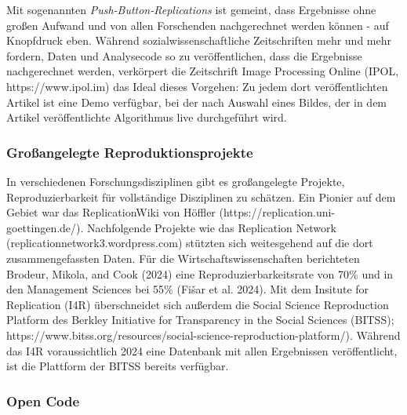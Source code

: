\documentclass[
  letterpaper,
  DIV=11,
  numbers=noendperiod]{scrreprt}
\begin{document}
\begin{tcolorbox}[enhanced jigsaw, left=2mm, colback=white, colframe=quarto-callout-note-color-frame, opacitybacktitle=0.6, opacityback=0, title=\textcolor{quarto-callout-note-color}{\faInfo}\hspace{0.5em}{Reproduktion auf Knopfdruck}, toptitle=1mm, coltitle=black, colbacktitle=quarto-callout-note-color!10!white, titlerule=0mm, bottomtitle=1mm, leftrule=.75mm, breakable, rightrule=.15mm, bottomrule=.15mm, toprule=.15mm, arc=.35mm]

Mit sogenannten \emph{Push-Button-Replications} ist gemeint, dass
Ergebnisse ohne großen Aufwand und von allen Forschenden nachgerechnet
werden können - auf Knopfdruck eben. Während sozialwissenschaftliche
Zeitschriften mehr und mehr fordern, Daten und Analysecode so zu
veröffentlichen, dass die Ergebnisse nachgerechnet werden, verkörpert
die Zeitschrift Image Processing Online (IPOL, https://www.ipol.im) das
Ideal dieses Vorgehen: Zu jedem dort veröffentlichten Artikel ist eine
Demo verfügbar, bei der nach Auswahl eines Bildes, der in dem Artikel
veröffentlichte Algorithmus live durchgeführt wird.

\end{tcolorbox}

\subsubsection{Großangelegte
Reproduktionsprojekte}\label{grouxdfangelegte-reproduktionsprojekte}

In verschiedenen Forschungsdisziplinen gibt es großangelegte Projekte,
Reproduzierbarkeit für vollständige Disziplinen zu schätzen. Ein Pionier
auf dem Gebiet war das ReplicationWiki von Höffler
(https://replication.uni-goettingen.de/). Nachfolgende Projekte wie das
Replication Network (replicationnetwork3.wordpress.com) stützten sich
weitesgehend auf die dort zusammengefassten Daten. Für die
Wirtschaftswissenschaften berichteten Brodeur, Mikola, and Cook (2024)
eine Reproduzierbarkeitsrate von 70\% und in den Management Sciences bei
55\% (Fišar et al. 2024). Mit dem Insitute for Replication (I4R)
überschneidet sich außerdem die Social Science Reproduction Platform des
Berkley Initiative for Transparency in the Social Sciences (BITSS);
https://www.bitss.org/resources/social-science-reproduction-platform/).
Während das I4R voraussichtlich 2024 eine Datenbank mit allen
Ergebnissen veröffentlicht, ist die Plattform der BITSS bereits
verfügbar.

\subsubsection{Open Code}\label{open-code}
\end{document}
